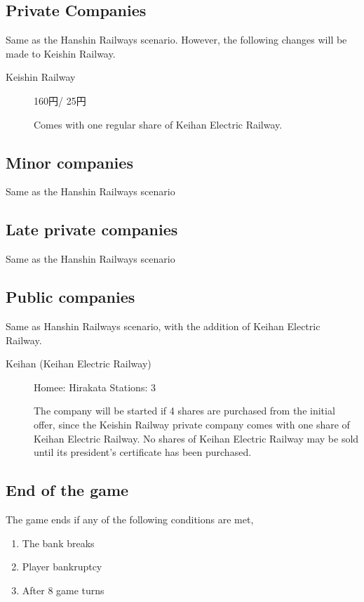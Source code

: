 \documentclass{article}
\begin{document}
\begin{CJK}{UTF8}{min}
\begin{multicols}{2}
\subsection{Private Companies}

Same as the Hanshin Railways scenario. However, the following changes will
be made to Keishin Railway.

\begin{description}
\item[Keishin Railway]  160円/ 25円

Comes with one regular share of Keihan Electric Railway.
\end{description}

\subsection{Minor companies}
Same as the Hanshin Railways scenario

\subsection{Late private companies}
Same as the Hanshin Railways scenario

\subsection{Public companies}
Same as Hanshin Railways scenario, with the addition of Keihan Electric Railway.

\begin{description}
\item[Keihan (Keihan Electric Railway)] \hfill

Homee: Hirakata \hfill Stations: 3

The company will be started if 4 shares are purchased from the initial
offer, since the Keishin Railway private company comes with one share of
Keihan Electric Railway. No shares of Keihan Electric Railway may be
sold until its president's certificate has been purchased.
\end{description}

\subsection{End of the game}
The game ends if any of the following conditions are met,
\begin{enumerate}
\item The bank breaks
\item Player bankruptcy
\item After 8 game turns
\end{enumerate}


\end{multicols}
\end{CJK}
\end{document}
